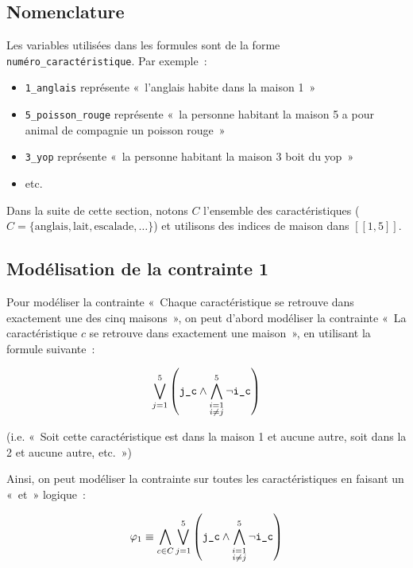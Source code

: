     \subsection{Nomenclature}
    Les variables utilisées dans les formules sont de la forme
    \verb|numéro_caractéristique|. Par exemple~:
    \begin{itemize}
        \item \verb|1_anglais| représente «~l’anglais habite dans la maison
            1~»
        \item \verb|5_poisson_rouge| représente «~la personne habitant la
            maison 5 a pour animal de compagnie un poisson rouge~»
        \item \verb|3_yop| représente «~la personne habitant la maison 3
            boit du yop~»
        \item etc.
    \end{itemize}

    Dans la suite de cette section, notons $C$ l’ensemble des caractéristiques
    ($C = \{\text{anglais}, \text{lait}, \text{escalade}, \dots\}$) et utilisons
    des indices de maison dans $[\![1, 5]\!]$.

    \subsection{Modélisation de la contrainte 1}
    Pour modéliser la contrainte «~Chaque caractéristique se retrouve dans
    exactement une des cinq maisons~», on peut d’abord modéliser la contrainte
    «~La caractéristique $c$ se retrouve dans exactement une maison~»,
    en utilisant la formule suivante~:

    \begin{equation*}
        \bigvee_{j = 1}^5 \left(\verb|j_c| \wedge \bigwedge_{\substack{i=1 \\ i \ne j}}^5 \neg \verb|i_c| \right)
    \end{equation*}

    (i.e. «~Soit cette caractéristique est dans la maison 1 et aucune autre,
    soit dans la 2 et aucune autre, etc.~»)

    Ainsi, on peut modéliser la contrainte sur toutes les caractéristiques en
    faisant un «~et~» logique~:

    \begin{equation*}
        \varphi_1 \equiv \bigwedge_{c\in C}\bigvee_{j = 1}^5 \left(\verb|j_c| \wedge \bigwedge_{\substack{i=1 \\ i \ne j}}^5 \neg \verb|i_c| \right)
    \end{equation*}


